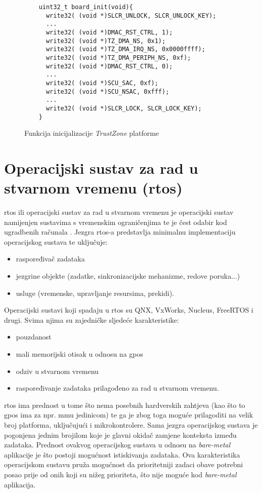 \documentclass[times, utf8, diplomski, numeric]{fer}
\begin{document}
\begin{figure}[H]
  \lstset{breaklines=true, xleftmargin=.05\textwidth}
  \begin{lstlisting}
    uint32_t board_init(void){
      write32( (void *)SLCR_UNLOCK, SLCR_UNLOCK_KEY);
      ...
      write32( (void *)DMAC_RST_CTRL, 1);
      write32( (void *)TZ_DMA_NS, 0x1);
      write32( (void *)TZ_DMA_IRQ_NS, 0x0000ffff);
      write32( (void *)TZ_DMA_PERIPH_NS, 0xf);
      write32( (void *)DMAC_RST_CTRL, 0);
      ...
      write32( (void *)SCU_SAC, 0xf);
      write32( (void *)SCU_NSAC, 0xfff);
      ...
      write32( (void *)SLCR_LOCK, SLCR_LOCK_KEY);
    }
  \end{lstlisting}
  \caption{Funkcija inicijalizacije \textit{TrustZone} platforme}
  \label{tz_init}
\end{figure}

\chapter{Operacijski sustav za rad u stvarnom vremenu (\gls{rtos})}
\gls{rtos} ili operacijski sustav za rad u stvarnom vremenu je operacijski sustav namijenjen sustavima s vremenskim ograničenjima
te je čest odabir kod ugradbenih računala \cite{ppius}. Jezgra \gls{rtos}-a predstavlja minimalnu implementaciju operacijskog
sustava te uključuje:
\begin{itemize}
  \item {raspoređivač zadataka}
  \item{jezgrine objekte (zadatke, sinkronizacijske mehanizme, redove poruka...)}
  \item{usluge (vremenske, upravljanje resursima, prekidi).}
\end{itemize}
Operacijski sustavi koji spadaju u \gls{rtos} su QNX, VxWorks, Nucleus, FreeRTOS i drugi. Svima njima su zajedničke sljedeće
karakteristike:
\begin{itemize}
  \item {pouzdanost}
  \item{mali memorijski otisak u odnosu na \gls{gpos}}
  \item{odziv u stvarnom vremenu}
  \item{raspoređivanje zadataka prilagođeno za rad u stvarnom vremenu.}
\end{itemize}
\gls{rtos} ima prednost u tome što nema posebnih hardverskih zahtjeva (kao što to \gls{gpos} ima za npr. \gls{mmu} jedinicom) te ga je zbog toga
moguće prilagoditi na velik broj platforma, uključujući i mikrokontrolere. Sama jezgra operacijskog sustava je pogonjena jednim
brojilom koje je glavni okidač zamjene konteksta između zadataka. Prednost ovakvog operacijskog sustava u odnosu na
\textit{bare-metal} aplikacije je što postoji mogućnost istiskivanja zadataka. Ova karakteristika operacijskom sustavu
pruža mogućnost da prioritetniji zadaci obave potrebni posao prije od onih koji su nižeg prioriteta, što nije moguće kod
\textit{bare-metal} aplikacija.
\end{document}
